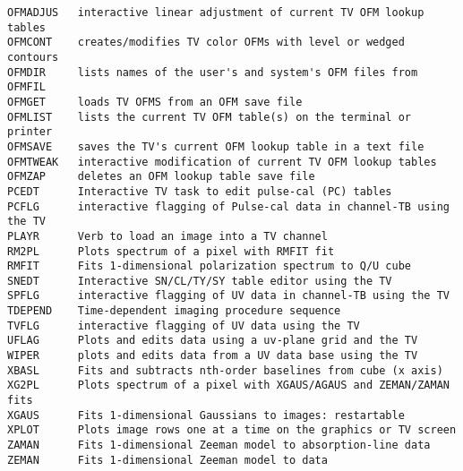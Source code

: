 \begin{verbatim}
OFMADJUS   interactive linear adjustment of current TV OFM lookup tables
OFMCONT    creates/modifies TV color OFMs with level or wedged contours
OFMDIR     lists names of the user's and system's OFM files from OFMFIL
OFMGET     loads TV OFMS from an OFM save file
OFMLIST    lists the current TV OFM table(s) on the terminal or printer
OFMSAVE    saves the TV's current OFM lookup table in a text file
OFMTWEAK   interactive modification of current TV OFM lookup tables
OFMZAP     deletes an OFM lookup table save file
PCEDT      Interactive TV task to edit pulse-cal (PC) tables
PCFLG      interactive flagging of Pulse-cal data in channel-TB using the TV
PLAYR      Verb to load an image into a TV channel
RM2PL      Plots spectrum of a pixel with RMFIT fit
RMFIT      Fits 1-dimensional polarization spectrum to Q/U cube
SNEDT      Interactive SN/CL/TY/SY table editor using the TV
SPFLG      interactive flagging of UV data in channel-TB using the TV
TDEPEND    Time-dependent imaging procedure sequence
TVFLG      interactive flagging of UV data using the TV
UFLAG      Plots and edits data using a uv-plane grid and the TV
WIPER      plots and edits data from a UV data base using the TV
XBASL      Fits and subtracts nth-order baselines from cube (x axis)
XG2PL      Plots spectrum of a pixel with XGAUS/AGAUS and ZEMAN/ZAMAN fits
XGAUS      Fits 1-dimensional Gaussians to images: restartable
XPLOT      Plots image rows one at a time on the graphics or TV screen
ZAMAN      Fits 1-dimensional Zeeman model to absorption-line data
ZEMAN      Fits 1-dimensional Zeeman model to data
\end{verbatim}\eve


